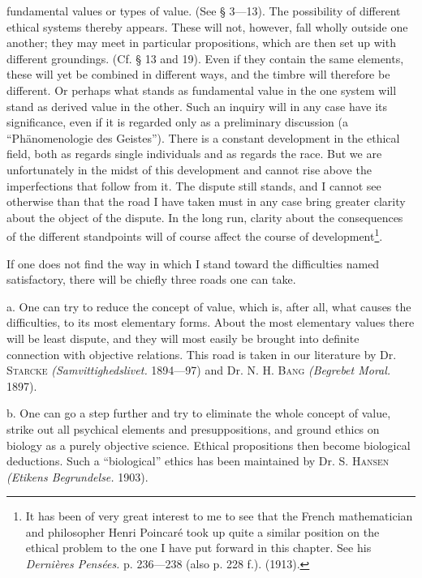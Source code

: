 \documentclass[12pt,a4paper,openany]{book}
\newcommand{\opage}[1]{\marginnote{\footnotesize\textit{[#1]}}}
\begin{document}
fundamental values or types of value. (See § 3---13). The possibility of different ethical systems
thereby appears. These will not, however, fall wholly outside one another; they may meet in particular
propositions, which are then set up with different groundings. (Cf. § 13 and 19). Even if they contain
the same elements, these will yet be combined in different ways, and the timbre will therefore be
different. Or perhaps what stands as fundamental value in the one system will stand as derived value
in the other. Such an inquiry will in any case have its significance, even if it is regarded only as a
preliminary discussion (a ``Phänomenologie des Geistes''). There is a constant development in the
ethical field, both as regards single individuals and as regards the race. But we are unfortunately
in the midst of this development and cannot rise above the imperfections that follow from it. The
dispute still stands, and I cannot see otherwise than that the road I have taken must in any case
bring greater clarity about the object of the dispute. In the long run, clarity about the consequences
of the different standpoints will of course affect the course of development\footnote[1]{It has been
of very great interest to me to see that the French mathematician and philosopher Henri Poincaré took
up quite a similar position on the ethical problem to the one I have put forward in this chapter. See
his \textit{Dernières Pensées.} p. 236---238 (also p. 228 f.). (1913).}.

If one does not find the way in which I stand toward the difficulties named satisfactory, there will be
chiefly three roads one can take.

a. One can try to reduce the concept of value, which is, after all, what causes the difficulties, to
its most elementary forms. About the most elementary values there will be least dispute, and they will
most easily be brought into definite connection
\opage{69}with objective relations. This road is taken in our literature by Dr. \textsc{Starcke}
\textit{(Samvittighedslivet.} 1894---97) and Dr. N. H. \textsc{Bang} \textit{(Begrebet Moral.} 1897).

b. One can go a step further and try to eliminate the whole concept of value, strike out all psychical
elements and presuppositions, and ground ethics on biology as a purely objective science. Ethical
propositions then become biological deductions. Such a ``biological'' ethics has been maintained by
Dr. S. \textsc{Hansen} \textit{(Etikens Begrundelse.} 1903).
\end{document}
